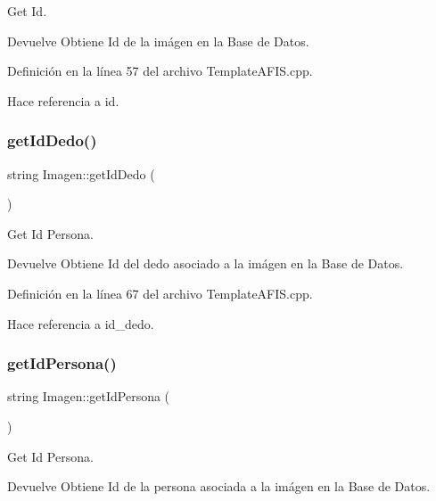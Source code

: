 Get Id. 

\begin{DoxyReturn}{Devuelve}
Obtiene Id de la imágen en la Base de Datos. 
\end{DoxyReturn}


Definición en la línea 57 del archivo Template\+A\+F\+I\+S.\+cpp.



Hace referencia a id.

\hypertarget{classImagen_af8f9c814f372583821f412e2475e9fda}{}\label{classImagen_af8f9c814f372583821f412e2475e9fda} 
\subsubsection{\texorpdfstring{get\+Id\+Dedo()}{getIdDedo()}}
{\footnotesize\ttfamily string Imagen\+::get\+Id\+Dedo (\begin{DoxyParamCaption}{ }\end{DoxyParamCaption})}



Get Id Persona. 

\begin{DoxyReturn}{Devuelve}
Obtiene Id del dedo asociado a la imágen en la Base de Datos. 
\end{DoxyReturn}


Definición en la línea 67 del archivo Template\+A\+F\+I\+S.\+cpp.



Hace referencia a id\+\_\+dedo.

\hypertarget{classImagen_a6fe8c566e03b1c6e2d6818b1886ad522}{}\label{classImagen_a6fe8c566e03b1c6e2d6818b1886ad522} 
\subsubsection{\texorpdfstring{get\+Id\+Persona()}{getIdPersona()}}
{\footnotesize\ttfamily string Imagen\+::get\+Id\+Persona (\begin{DoxyParamCaption}{ }\end{DoxyParamCaption})}



Get Id Persona. 

\begin{DoxyReturn}{Devuelve}
Obtiene Id de la persona asociada a la imágen en la Base de Datos. 
\end{DoxyReturn}


